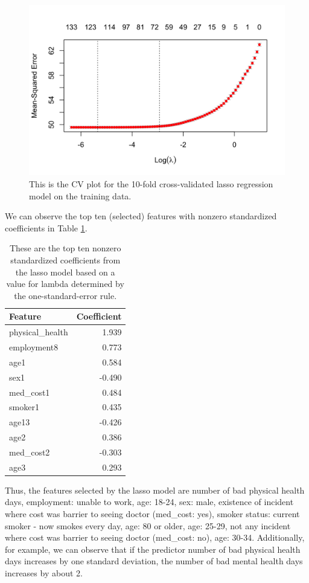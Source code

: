 \documentclass[
]{article}
\begin{document}
\begin{figure}[H]

{\centering \includegraphics[width=0.8\linewidth]{../results/lasso-cv-plot} 

}

\caption{This is the CV plot for the 10-fold cross-validated lasso regression model on the training data.}\label{fig:lasso-cv-plot}
\end{figure}

We can observe the top ten (selected) features with nonzero standardized coefficients in Table \ref{tab:top-10-lasso-coefficients}.

\begin{table}[H]

\caption{\label{tab:top-10-lasso-coefficients}These are the top ten nonzero standardized coefficients 
        from the lasso model based on a value for lambda determined by 
        the one-standard-error rule.}
\centering
\begin{tabular}[t]{lr}
\toprule
Feature & Coefficient\\
\midrule
physical\_health & 1.939\\
employment8 & 0.773\\
age1 & 0.584\\
sex1 & -0.490\\
med\_cost1 & 0.484\\
\addlinespace
smoker1 & 0.435\\
age13 & -0.426\\
age2 & 0.386\\
med\_cost2 & -0.303\\
age3 & 0.293\\
\bottomrule
\end{tabular}
\end{table}

Thus, the features selected by the lasso model are number of bad physical health days, employment: unable to work, age: 18-24, sex: male, existence of incident where cost was barrier to seeing doctor (med\_cost: yes), smoker status: current smoker - now smokes every day, age: 80 or older, age: 25-29, not any incident where cost was barrier to seeing doctor (med\_cost: no), age: 30-34. Additionally, for example, we can observe that if the predictor number of bad physical health days increases by one standard deviation, the number of bad mental health days increases by about 2.
\end{document}
